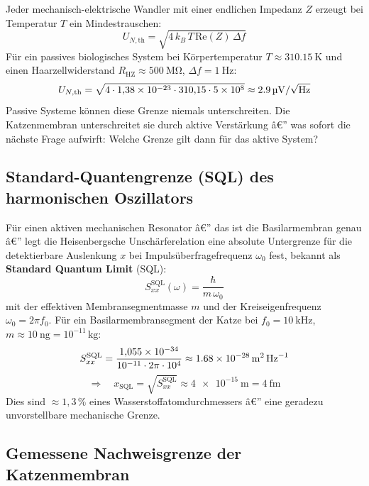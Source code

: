 ﻿\documentclass[12pt,a4paper,titlepage]{report}
\begin{document}
Jeder mechanisch-elektrische Wandler mit einer endlichen Impedanz $Z$ erzeugt
bei Temperatur $T$ ein Mindestrauschen:
\[
  U_{N,\text{th}} = \sqrt{4\,k_B\,T\,\mathrm{Re}(Z)\,\Delta f}
\]
Für ein passives biologisches System bei Körpertemperatur
$T \approx \SI{310.15}{\kelvin}$ und einen Haarzellwiderstand
$R_{\text{HZ}} \approx \SI{500}{\mega\ohm}$, $\Delta f = \SI{1}{\hertz}$:
\[
  U_{N,\text{th}} = \sqrt{4 \cdot 1{,}38\times10^{-23} \cdot 310{,}15 \cdot 5\times10^8}
  \approx \SI{2{,}9}{\micro\volt\per\sqrt{\hertz}}
\]
Passive Systeme können diese Grenze niemals unterschreiten.
Die Katzenmembran unterschreitet sie durch aktive Verstärkung â€” was sofort die
nächste Frage aufwirft: Welche Grenze gilt dann für das aktive System?

\subsection{Standard-Quantengrenze (SQL) des harmonischen Oszillators}

Für einen aktiven mechanischen Resonator â€” das ist die Basilarmembran genau â€”
legt die Heisenbergsche Unschärferelation eine absolute Untergrenze für die
detektierbare Auslenkung $x$ bei Impulsüberfragefrequenz $\omega_0$ fest,
bekannt als \textbf{Standard Quantum Limit} (SQL):
\[
  S_{xx}^{\mathrm{SQL}}(\omega) = \frac{\hbar}{m\,\omega_0}
\]
mit der effektiven Membransegmentmasse $m$ und der Kreiseigenfrequenz
$\omega_0 = 2\pi f_0$.
Für ein Basilarmembransegment der Katze bei $f_0 = \SI{10}{\kilo\hertz}$,
$m \approx \SI{10}{\nano\gram} = 10^{-11}\,\text{kg}$:
\[
  S_{xx}^{\mathrm{SQL}}
  = \frac{1{,}055\times10^{-34}}{10^{-11}\cdot 2\pi\cdot 10^4}
  \approx \SI{1{,}68e-28}{\meter\squared\per\hertz}
\]
\[
  \Rightarrow\quad x_{\mathrm{SQL}} = \sqrt{S_{xx}^{\mathrm{SQL}}}
  \approx \SI{4e-15}{\meter} = \SI{4}{\femto\meter}
\]
Dies sind $\approx 1{,}3\,\%$ eines Wasserstoffatomdurchmessers â€” eine geradezu
unvorstellbare mechanische Grenze.

\subsection{Gemessene Nachweisgrenze der Katzenmembran}
\end{document}
